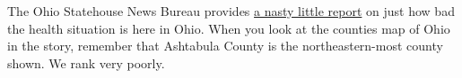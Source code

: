 The Ohio Statehouse News Bureau provides
\href{https://web.archive.org/web/20240112061519/https://www.statenews.org/news/2024-01-11/how-healthy-is-ohio-depends-on-where-you-live}{a
nasty little report} on just how bad the health situation is here in
Ohio. When you look at the counties map of Ohio in the story, remember
that Ashtabula County is the northeastern-most county shown. We rank
very poorly.
